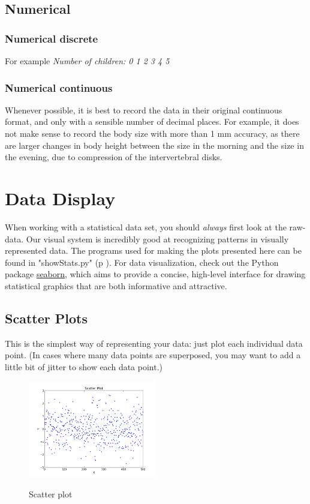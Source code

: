 \subsection{Numerical}

\subsubsection{Numerical discrete}
For example \emph{Number of children: 0 1 2 3 4 5}

\subsubsection{Numerical continuous}
Whenever possible, it is best to record the data in their original continuous format, and only with a sensible number of decimal places. For example, it does not make sense to record the body size with more than 1 mm accuracy, as there are larger changes in body height between the size in the morning and the size in the evening, due to compression of the intervertebral disks.

\section{Data Display}

When working with a statistical data set, you should \emph{always} first look at the raw-data. Our visual system is incredibly good at recognizing patterns in visually represented data. The programs used for making the plots presented here can be found in "showStats.py" (p \pageref{py:showStats}). For data visualization, check out the Python package \href{http://www.stanford.edu/~mwaskom/software/seaborn/} {seaborn}, which aims to provide a concise, high-level interface for drawing statistical graphics that are both informative and attractive.

\subsection{Scatter Plots}

This is the simplest way of representing your data: just plot each individual data point. (In cases where many data points are superposed, you may want to add a little bit of jitter to show each data point.)

\begin{figure}[h]
  \centering
  \includegraphics[width=0.5\textwidth]{../Images/scatterPlot.png}\\
  \caption{Scatter plot}
\end{figure}

